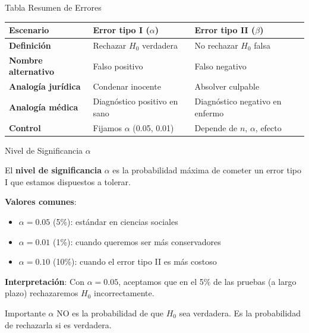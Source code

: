 \documentclass[aspectratio=169, 11pt]{beamer}
\begin{document}
\begin{frame}{Tabla Resumen de Errores}
\begin{table}
\centering
\small
\begin{tabular}{p{2.8cm}p{3.8cm}p{3.8cm}}
\toprule
\textbf{Escenario} & \textbf{Error tipo I ($\alpha$)} & \textbf{Error tipo II ($\beta$)} \\
\midrule
\textbf{Definición} & Rechazar $H_0$ verdadera & No rechazar $H_0$ falsa \\[0.15cm]
\textbf{Nombre alternativo} & Falso positivo & Falso negativo \\[0.15cm]
\textbf{Analogía jurídica} & Condenar inocente & Absolver culpable \\[0.15cm]
\textbf{Analogía médica} & Diagnóstico positivo en sano & Diagnóstico negativo en enfermo \\[0.15cm]
\textbf{Control} & Fijamos $\alpha$ (0.05, 0.01) & Depende de $n$, $\alpha$, efecto \\
\bottomrule
\end{tabular}
\end{table}
\end{frame}

\begin{frame}{Nivel de Significancia $\alpha$}
\begin{definition}
El \textbf{nivel de significancia} $\alpha$ es la probabilidad máxima de cometer un error tipo I que estamos dispuestos a tolerar.
\end{definition}

\vspace{0.2cm}
\textbf{Valores comunes}:
\begin{itemize}
  \item $\alpha = 0.05$ (5\%): estándar en ciencias sociales
  \item $\alpha = 0.01$ (1\%): cuando queremos ser más conservadores
  \item $\alpha = 0.10$ (10\%): cuando el error tipo II es más costoso
\end{itemize}

\vspace{0.2cm}
\textbf{Interpretación}: Con $\alpha = 0.05$, aceptamos que en el 5\% de las pruebas (a largo plazo) rechazaremos $H_0$ incorrectamente.

\begin{alertblock}{Importante}
$\alpha$ NO es la probabilidad de que $H_0$ sea verdadera. Es la probabilidad de rechazarla \alert{si} es verdadera.
\end{alertblock}
\end{frame}
\end{document}
